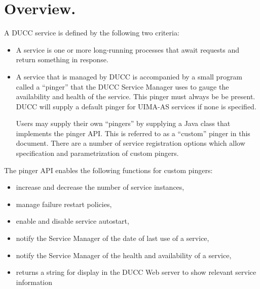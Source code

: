 % 
% 
% 
% 

      \section{Overview.} 
      A DUCC service is defined by the following two criteria:
      \begin{itemize}
          \item A service is one or more long-running processes that await requests
            and return something in response. 
          \item A service that is managed by DUCC is accompanied by a small program called a
            ``pinger'' that the DUCC Service Manager uses to gauge the availability and health of
            the service.  This pinger must always be be present. DUCC will supply a default
            pinger for UIMA-AS services if none is specified.
            
            Users may supply their own ``pingers'' by supplying a Java class that implements
            the pinger API.  This is referred to as a ``custom'' pinger in this document. 
            There are a number of service registration options which  allow
            specification and parametrization of custom pingers.

          \end{itemize}
      The pinger API enables the following functions for custom pingers:
      \begin{itemize}
      \item increase and decrease the number of service instances, 
      \item manage failure restart policies, 
      \item enable and disable service autostart, 
      \item notify the Service Manager of the date of last use of a service, 
      \item notify the Service Manager of the health and availability of a service, 
      \item returns a string for display in the DUCC Web server to show relevant service information
      \end{itemize}
      

